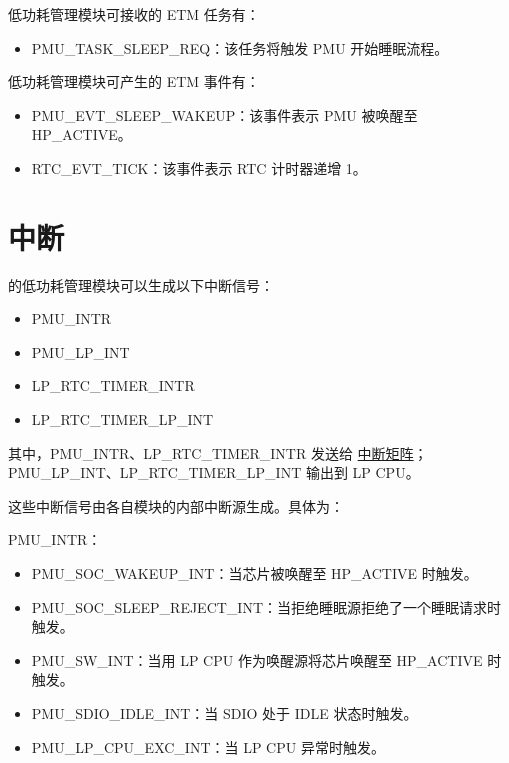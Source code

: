 \documentclass[main\_\_CN.tex]{subfiles}
\begin{document}
低功耗管理模块可接收的 ETM 任务有：

\begin{itemize}
\item PMU\_TASK\_SLEEP\_REQ：该任务将触发 PMU 开始睡眠流程。
\end{itemize}

低功耗管理模块可产生的 ETM 事件有：

\begin{itemize}
\item PMU\_EVT\_SLEEP\_WAKEUP：该事件表示 PMU 被唤醒至 HP\_ACTIVE。
\item RTC\_EVT\_TICK：该事件表示 RTC 计时器递增 1。
\end{itemize}



\section{中断}

\chipname{} 的低功耗管理模块可以生成以下中断信号：

\begin{itemize}
    \item PMU\_INTR
    \item PMU\_LP\_INT
    \item LP\_RTC\_TIMER\_INTR
    \item LP\_RTC\_TIMER\_LP\_INT
\end{itemize}

其中，PMU\_INTR、LP\_RTC\_TIMER\_INTR 发送给 \hyperref[mod:intmtrx]{中断矩阵}；PMU\_LP\_INT、LP\_RTC\_TIMER\_LP\_INT 输出到 LP CPU。

这些中断信号由各自模块的内部中断源生成。具体为：

PMU\_INTR：

\begin{itemize}
\item \label{int:PMUSOCWAKEUPINT}PMU\_SOC\_WAKEUP\_INT：当芯片被唤醒至 HP\_ACTIVE 时触发。

\item \label{int:PMUSOCSLEEPREJECTINT}PMU\_SOC\_SLEEP\_REJECT\_INT：当拒绝睡眠源拒绝了一个睡眠请求时触发。

\item \label{int:PMUSWINT}PMU\_SW\_INT：当用 LP CPU 作为唤醒源将芯片唤醒至 HP\_ACTIVE 时触发。
\item \label{int:PMUSDIOIDLEINT}PMU\_SDIO\_IDLE\_INT：当 SDIO 处于 IDLE 状态时触发。
\item \label{int:PMULPCPUEXCINT}PMU\_LP\_CPU\_EXC\_INT：当 LP CPU 异常时触发。
\end{itemize}
\end{document}
